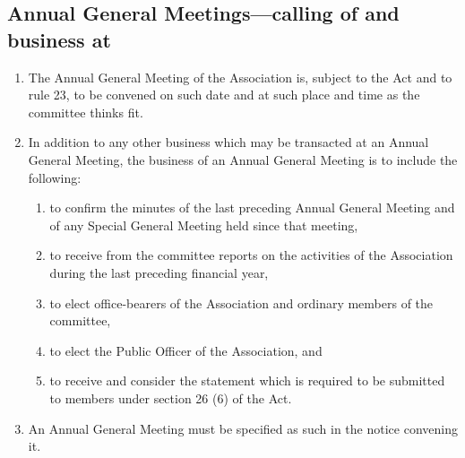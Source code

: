 \documentclass{article}
\begin{document}
\subsection{Annual General Meetings—calling of and business at}
\begin{enumerate}
  \item The Annual General Meeting of the Association is, subject to the Act and to rule 23, to be convened on such date and at such place and time as the committee thinks fit.
  \item In addition to any other business which may be transacted at an Annual General Meeting, the business of an Annual General Meeting is to include the following:
    \begin{enumerate}
      \item to confirm the minutes of the last preceding Annual General Meeting and of any Special General Meeting held since that meeting,
      \item to receive from the committee reports on the activities of the Association during the last preceding financial year,
      \item to elect office-bearers of the Association and ordinary members of the committee,
      \item to elect the Public Officer of the Association, and
      \item to receive and consider the statement which is required to be submitted to members under section 26 (6) of the Act.
    \end{enumerate}
  \item An Annual General Meeting must be specified as such in the notice convening it.
\end{enumerate}
\end{document}

